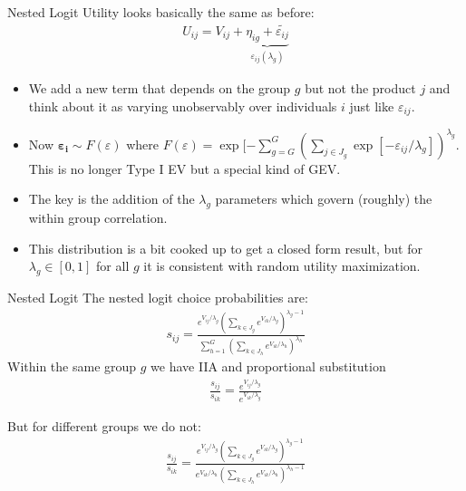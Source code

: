 \documentclass[aspectratio=169,11pt]{beamer}
\begin{document}
\begin{frame}{Nested Logit}
Utility looks basically the same as before:
\begin{eqnarray*}
U_{ij} = V_{ij} + \underbrace{\eta_{ig} + \widetilde{\varepsilon_{ij}}}_{\varepsilon_{ij}(\lambda_g)}
\end{eqnarray*}
\begin{itemize}
\item We add a new term that depends on the group $g$ but not the product $j$ and think about it as varying unobservably over individuals $i$ just like $\varepsilon_{ij}$.
\item Now $\symbf{\varepsilon_i} \sim F(\varepsilon)$ where $F(\varepsilon) = \exp[-\sum_{g=G}^G \left(\sum_{j \in J_g} \exp[-\varepsilon_{ij}/\lambda_g]\right)^{\lambda_g}$. This is no longer Type I EV but a special kind of GEV.
\item The key is the addition of the $\lambda_g$ parameters which govern (roughly) the within group correlation.
\item This distribution is a bit cooked up to get a closed form result, but for $\lambda_g \in [0,1]$ for all $g$ it is consistent with random utility maximization.
\end{itemize}
\end{frame}

\begin{frame}{Nested Logit}
\small
The nested logit choice probabilities are:
\begin{eqnarray*}
s_{ij} = \frac{ e^{V_{ij}/\lambda_g} \left(\sum_{k \in J_g} e^{V_{ik}/\lambda_g} \right)^{\lambda_g -1}}{\sum_{h=1}^G \left(\sum_{k \in J_h} e^{V_{ik}/\lambda_h} \right)^{\lambda_h}}
\end{eqnarray*}
Within the same group $g$ we have IIA and proportional substitution
\begin{eqnarray*}
\frac{s_{ij}}{s_{ik}} = \frac{ e^{V_{ij}/\lambda_g}}{ e^{V_{ik}/\lambda_g}}
\end{eqnarray*}

But for different groups we do not:
\begin{eqnarray*}
\frac{s_{ij}}{s_{ik}} = \frac{ e^{V_{ij}/\lambda_g} \left(\sum_{k \in J_g} e^{V_{ik}/\lambda_g} \right)^{\lambda_g -1}}{ e^{V_{ik}/\lambda_h} \left(\sum_{k \in J_h} e^{V_{ik}/\lambda_h} \right)^{\lambda_h -1}}
\end{eqnarray*}
\end{frame}
\end{document}
